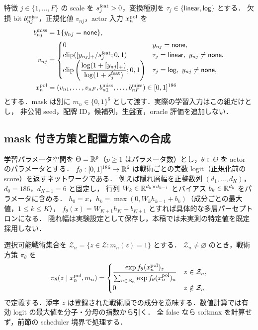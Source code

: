 特徴 $j\in\{1,\ldots,F\}$ の scale を $s_j^{\rm feat}>0$，変換種別を $\tau_j\in\{\mathsf{linear},\mathsf{log}\}$ とする．
欠損 bit $b_{nj}^{\rm miss}$，正規化値 $v_{nj}$，actor 入力 $x_n^{\rm pol}$ を
\begin{align}
 b_{nj}^{\rm miss}&=\mathbf{1}\{y_{nj}=\mathsf{none}\},\label{eq:missing}\\
 v_{nj}&=\begin{cases}
 0&y_{nj}=\mathsf{none},\\
 \operatorname{clip}([y_{nj}]_+/s_j^{\rm feat};0,1)&\tau_j=\mathsf{linear},\ y_{nj}\ne\mathsf{none},\\
 \operatorname{clip}\left(\dfrac{\log(1+[y_{nj}]_+)}{\log(1+s_j^{\rm feat})};0,1\right)&\tau_j=\mathsf{log},\ y_{nj}\ne\mathsf{none},
 \end{cases}\label{eq:normalize}\\
 x_n^{\rm pol}&=(v_{n1},\ldots,v_{nF},b_{n1}^{\rm miss},\ldots,b_{nF}^{\rm miss})\in[0,1]^{186}
 \label{eq:actor-input}
\end{align}
とする．mask は別に $m_n\in\{0,1\}^6$ として渡す．実際の学習入力はこの組だけとし，
非公開 seed，配牌 ID，候補列，生盤面，oracle 評価を追加しない．

\subsection{mask 付き方策と配置方策への合成}
学習パラメータ空間を $\Theta=\mathbb{R}^p$（$p\ge1$ はパラメータ数）とし，$\theta\in\Theta$ を actor のパラメータとする．
$f_\theta:[0,1]^{186}\to\mathbb{R}^6$ は戦術ごとの実数 logit（正規化前の score）を返すネットワークである．
例えば隠れ層幅を正整数列 $(d_1,\ldots,d_K)$，$d_0=186$，$d_{K+1}=6$ と固定し，
行列 $W_k\in\mathbb{R}^{d_k\times d_{k-1}}$ とバイアス $b_k\in\mathbb{R}^{d_k}$ をパラメータに含める．
$h_0=x$，$h_k=\max(0,W_kh_{k-1}+b_k)$（成分ごとの最大値，$1\le k\le K$），
$f_\theta(x)=W_{K+1}h_K+b_{K+1}$ とすれば具体的な多層パーセプトロンになる．
隠れ幅は実験設定として保存し，本稿では未実測の特定値を既定採用しない．

選択可能戦術集合を $\mathcal Z_n=\{z\in\mathcal Z:m_n(z)=1\}$ とする．
$\mathcal Z_n\ne\varnothing$ のとき，戦術方策 $\pi_\theta$ を
\begin{equation}\label{eq:policy}
 \pi_\theta(z\mid x_n^{\rm pol},m_n)=
 \begin{cases}
 \dfrac{\exp f_\theta(x_n^{\rm pol})_z}
       {\sum_{u\in\mathcal Z_n}\exp f_\theta(x_n^{\rm pol})_u}&z\in\mathcal Z_n,\\
 0&z\notin\mathcal Z_n
 \end{cases}
\end{equation}
で定義する．添字 $z$ は登録された戦術順での成分を意味する．数値計算では有効 logit の最大値を分子・分母の指数から引く．
全 false なら softmax を計算せず，前節の scheduler 境界で処理する．

